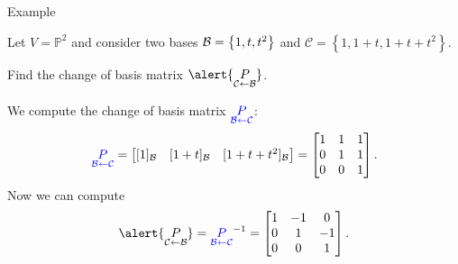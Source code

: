 \documentclass[xcolor=dvipsnames,aspectratio=169,t]{beamer}
\renewcommand{\C}{\mathcal{C}}
\begin{document}
\begin{frame}{Example}
  \medskip
  
  Let $V = \mathbb{P}^2$ and consider two bases
  $\mathcal{B} = \left\{ 1, t, t^2 \right\}$ and $\C = \left\{ 1, 1+t, 1+t+t^2 \right\}$.
  \smallskip

  Find the change of basis matrix $\alert{\underset{\C \leftarrow \B}P}$.
  \bigskip

  \pause
  We compute the change of basis matrix $\blue{\underset{\B\leftarrow \C}P}$:
  \[
    \blue{\underset{\B\leftarrow \C}P} =
    \begin{bmatrix} [1]_\B & [1+t]_\B & [1+t+t^2]_\B \end{bmatrix}
    =\begin{bmatrix} 1 & 1 & 1 \\ 0 & 1 & 1 \\ 0 & 0 & 1 \end{bmatrix}.
  \]
  Now we can compute
  \[
    \alert{\underset{\C \leftarrow \B}P} =
    \blue{\underset{\B\leftarrow \C}P} ^{-1} =
    \begin{bmatrix} 1 & -1 & 0 \\ 0 & 1 & -1 \\ 0 & 0 & 1 \end{bmatrix}.
  \]
\end{frame}
\end{document}
